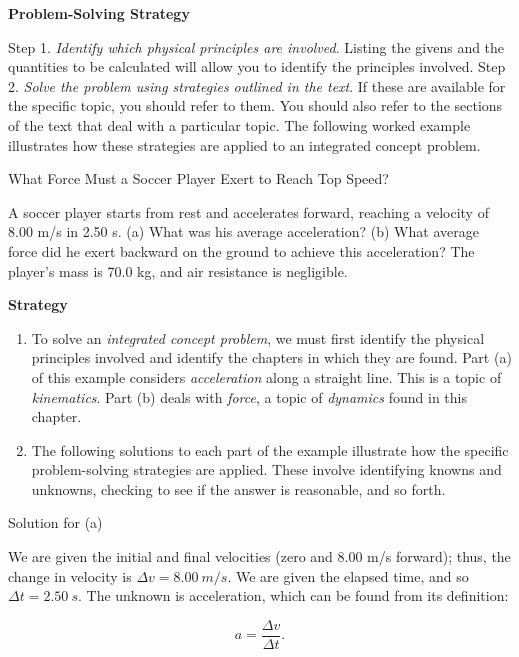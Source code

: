 \documentclass[
]{book}
\providecommand{\tightlist}{%
  \setlength{\itemsep}{0pt}\setlength{\parskip}{0pt}}
\begin{document}
\textbf{Problem-Solving Strategy}

Step 1. \emph{Identify which physical principles are involved}. Listing the
givens and the quantities to be calculated will allow you to identify
the principles involved. {\hfill\break
}Step 2. \emph{Solve the problem using strategies
outlined in the text}. If these are available for the specific topic,
you should refer to them. You should also refer to the sections of the
text that deal with a particular topic. The following worked example
illustrates how these strategies are applied to an integrated concept
problem.

\hypertarget{fs-id2653259}{}
What Force Must a Soccer Player Exert to Reach Top Speed?

A soccer player starts from rest and accelerates forward, reaching a
velocity of 8.00 m/s in 2.50 s. (a) What was his average acceleration?
(b) What average force did he exert backward on the ground to achieve
this acceleration? The player's mass is 70.0 kg, and air resistance is
negligible.

\textbf{Strategy}

\begin{enumerate}
\def\labelenumi{\arabic{enumi}.}
\tightlist
\item
  \protect\hypertarget{import-auto-id2956703}{}{\emph{} To solve an \emph{integrated concept
  problem}, we must first identify the physical principles involved
  and identify the chapters in which they are found. Part (a) of this
  example considers \emph{acceleration} along a straight line. This is a
  topic of \emph{kinematics}. Part (b) deals with \emph{force}, a topic of
  \emph{dynamics} found in this chapter.}
\item
  \protect\hypertarget{import-auto-id3020678}{}{\emph{} The following solutions to each
  part of the example illustrate how the specific problem-solving
  strategies are applied. These involve identifying knowns and
  unknowns, checking to see if the answer is reasonable, and so
  forth.}
\end{enumerate}

{Solution for (a)}

We are given the initial and final velocities (zero and 8.00 m/s
forward); thus, the change in velocity is \(\Delta v = 8.00\ m/s\). We are
given the elapsed time, and so \({\Delta t = 2.50\ s}{}\). The unknown is
acceleration, which can be found from its definition:

\leavevmode{}%
\[{a = \frac{\Delta v}{\Delta t}}.\]
\end{document}
